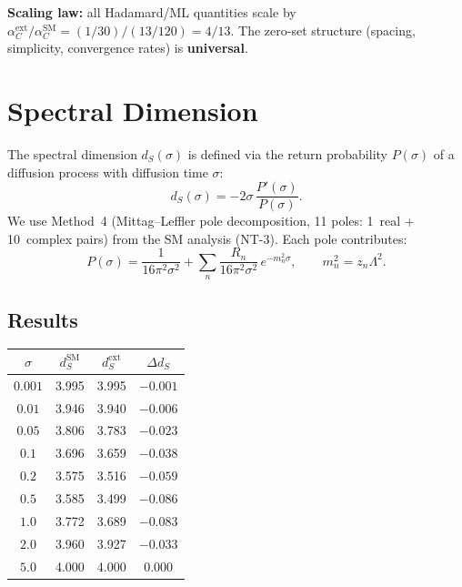 \documentclass[11pt,a4paper]{article}
\begin{document}
\textbf{Scaling law:}
all Hadamard/ML quantities scale by
$\alpha_C^{\mathrm{ext}}/\alpha_C^{\mathrm{SM}} = (1/30)/(13/120) = 4/13$.
The zero-set structure (spacing, simplicity, convergence rates) is \textbf{universal}.


\section{Spectral Dimension}
\label{sec:spectral-dim}

The spectral dimension $d_S(\sigma)$ is defined via the return probability $P(\sigma)$
of a diffusion process with diffusion time $\sigma$:
\begin{equation}
  d_S(\sigma) = -2\sigma\,\frac{P'(\sigma)}{P(\sigma)}.
\end{equation}
We use Method~4 (Mittag--Leffler pole decomposition, 11 poles: 1~real + 10~complex pairs)
from the SM analysis (NT-3).  Each pole contributes:
\begin{equation}
  P(\sigma) = \frac{1}{16\pi^2\sigma^2}
  + \sum_n \frac{R_n}{16\pi^2\sigma^2}\,e^{-m_n^2\sigma},
  \qquad m_n^2 = z_n\Lambda^2.
\end{equation}

\subsection{Results}

\begin{center}
\begin{tabular}{cccc}
\toprule
$\sigma$ & $d_S^{\mathrm{SM}}$ & $d_S^{\mathrm{ext}}$ & $\Delta d_S$ \\
\midrule
$0.001$ & 3.995 & 3.995 & $-0.001$ \\
$0.01$ & 3.946 & 3.940 & $-0.006$ \\
$0.05$ & 3.806 & 3.783 & $-0.023$ \\
$0.1$ & 3.696 & 3.659 & $-0.038$ \\
$0.2$ & 3.575 & 3.516 & $-0.059$ \\
$0.5$ & 3.585 & 3.499 & $\mathbf{-0.086}$ \\
$1.0$ & 3.772 & 3.689 & $-0.083$ \\
$2.0$ & 3.960 & 3.927 & $-0.033$ \\
$5.0$ & 4.000 & 4.000 & $0.000$ \\
\bottomrule
\end{tabular}
\end{center}
\end{document}
